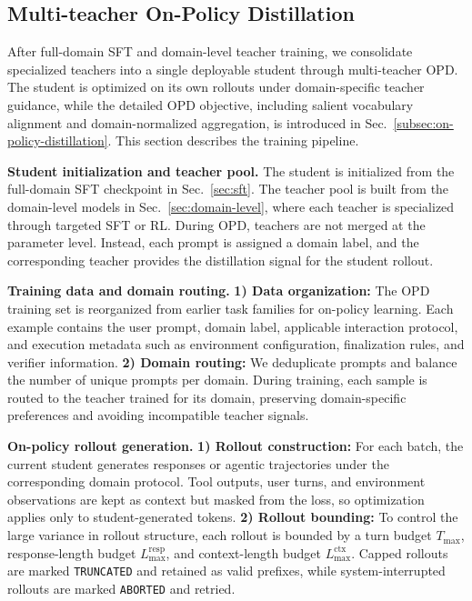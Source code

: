 
\subsection{Multi-teacher On-Policy Distillation}
\label{sec:multi-opd}

After full-domain SFT and domain-level teacher training, we consolidate specialized teachers into a single deployable student through multi-teacher OPD. The student is optimized on its own rollouts under domain-specific teacher guidance, while the detailed OPD objective, including salient vocabulary alignment and domain-normalized aggregation, is introduced in Sec.~\ref{subsec:on-policy-distillation}. This section describes the training pipeline.

\textbf{Student initialization and teacher pool.}
The student is initialized from the full-domain SFT checkpoint in Sec.~\ref{sec:sft}. The teacher pool is built from the domain-level models in Sec.~\ref{sec:domain-level}, where each teacher is specialized through targeted SFT or RL. During OPD, teachers are not merged at the parameter level. Instead, each prompt is assigned a domain label, and the corresponding teacher provides the distillation signal for the student rollout.

\textbf{Training data and domain routing.}
\textbf{1) Data organization:} The OPD training set is reorganized from earlier task families for on-policy learning. Each example contains the user prompt, domain label, applicable interaction protocol, and execution metadata such as environment configuration, finalization rules, and verifier information. 
\textbf{2) Domain routing:} We deduplicate prompts and balance the number of unique prompts per domain. During training, each sample is routed to the teacher trained for its domain, preserving domain-specific preferences and avoiding incompatible teacher signals.

\textbf{On-policy rollout generation.}
\textbf{1) Rollout construction:} For each batch, the current student generates responses or agentic trajectories under the corresponding domain protocol. Tool outputs, user turns, and environment observations are kept as context but masked from the loss, so optimization applies only to student-generated tokens. 
\textbf{2) Rollout bounding:} To control the large variance in rollout structure, each rollout is bounded by a turn budget $T_{\max}$, response-length budget $L_{\max}^{\mathrm{resp}}$, and context-length budget $L_{\max}^{\mathrm{ctx}}$. Capped rollouts are marked \texttt{TRUNCATED} and retained as valid prefixes, while system-interrupted rollouts are marked \texttt{ABORTED} and retried.


